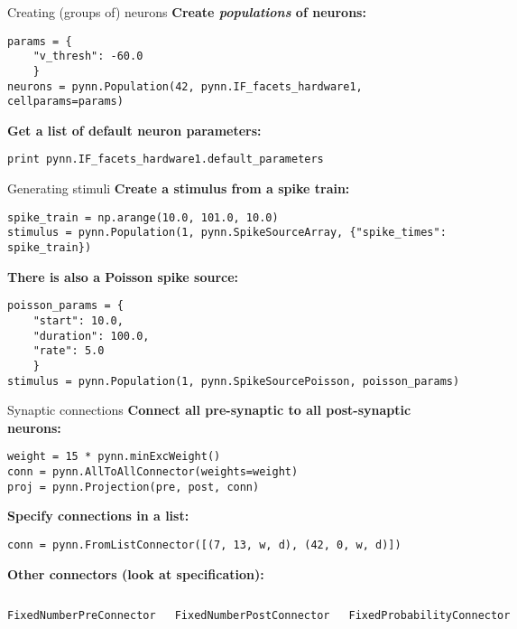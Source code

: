 \documentclass[aspectratio=169]{beamer}
\begin{document}
\begin{frame}[fragile]{Creating (groups of) neurons}
	\textbf{Create \emph{populations} of neurons:}
	\begin{verbatim}
params = {
    "v_thresh": -60.0
    }
neurons = pynn.Population(42, pynn.IF_facets_hardware1, cellparams=params)
	\end{verbatim}

	\vspace{3ex}

	\textbf{Get a list of default neuron parameters:}
	\begin{verbatim}
print pynn.IF_facets_hardware1.default_parameters
	\end{verbatim}
\end{frame}

\begin{frame}[fragile]{Generating stimuli}
	\textbf{Create a stimulus from a spike train:}
	\begin{verbatim}
spike_train = np.arange(10.0, 101.0, 10.0)
stimulus = pynn.Population(1, pynn.SpikeSourceArray, {"spike_times": spike_train})
	\end{verbatim}

	\vspace{3ex}

	\textbf{There is also a Poisson spike source:}
	\begin{verbatim}
poisson_params = {
    "start": 10.0,
    "duration": 100.0,
    "rate": 5.0
    }
stimulus = pynn.Population(1, pynn.SpikeSourcePoisson, poisson_params)
	\end{verbatim}
\end{frame}

\begin{frame}[fragile]{Synaptic connections}
	\textbf{Connect all pre-synaptic to all post-synaptic neurons:}
	\begin{verbatim}
weight = 15 * pynn.minExcWeight()
conn = pynn.AllToAllConnector(weights=weight)
proj = pynn.Projection(pre, post, conn)
	\end{verbatim}

	\vspace{3ex}

	\textbf{Specify connections in a list:}
	\begin{verbatim}
conn = pynn.FromListConnector([(7, 13, w, d), (42, 0, w, d)])
	\end{verbatim}

	\vspace{3ex}

	\textbf{Other connectors (look at specification):}
	\begin{columns}[onlytextwidth]
		\texttt{FixedNumberPreConnector}

		\texttt{FixedNumberPostConnector}

		\texttt{FixedProbabilityConnector}
	\end{columns}
\end{frame}
\end{document}
